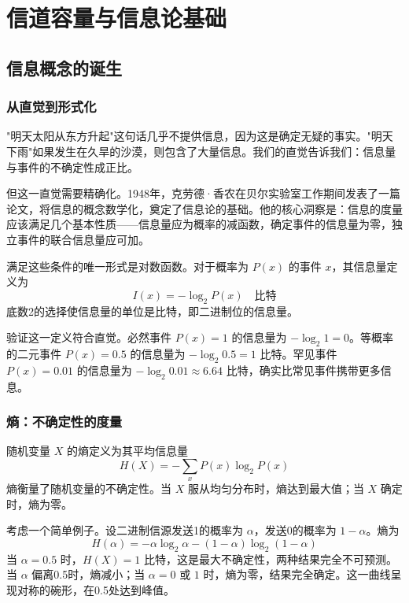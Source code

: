 \section{信道容量与信息论基础}

\subsection{信息概念的诞生}

\subsubsection{从直觉到形式化}

"明天太阳从东方升起"这句话几乎不提供信息，因为这是确定无疑的事实。"明天下雨"如果发生在久旱的沙漠，则包含了大量信息。我们的直觉告诉我们：信息量与事件的不确定性成正比。

但这一直觉需要精确化。1948年，克劳德·香农在贝尔实验室工作期间发表了一篇论文，将信息的概念数学化，奠定了信息论的基础。他的核心洞察是：信息的度量应该满足几个基本性质——信息量应为概率的减函数，确定事件的信息量为零，独立事件的联合信息量应可加。

满足这些条件的唯一形式是对数函数。对于概率为 $P(x)$ 的事件 $x$，其信息量定义为
\begin{equation}
    I(x) = -\log_2 P(x) \quad \text{比特}
\end{equation}
底数2的选择使信息量的单位是比特，即二进制位的信息量。

验证这一定义符合直觉。必然事件 $P(x)=1$ 的信息量为 $-\log_2 1 = 0$。等概率的二元事件 $P(x)=0.5$ 的信息量为 $-\log_2 0.5 = 1$ 比特。罕见事件 $P(x)=0.01$ 的信息量为 $-\log_2 0.01 \approx 6.64$ 比特，确实比常见事件携带更多信息。

\subsubsection{熵：不确定性的度量}

随机变量 $X$ 的熵定义为其平均信息量
\begin{equation}
    H(X) = -\sum_{x} P(x) \log_2 P(x)
\end{equation}
熵衡量了随机变量的不确定性。当 $X$ 服从均匀分布时，熵达到最大值；当 $X$ 确定时，熵为零。

考虑一个简单例子。设二进制信源发送1的概率为 $\alpha$，发送0的概率为 $1-\alpha$。熵为
\begin{equation}
    H(\alpha) = -\alpha \log_2 \alpha - (1-\alpha) \log_2 (1-\alpha)
\end{equation}
当 $\alpha = 0.5$ 时，$H(X) = 1$ 比特，这是最大不确定性，两种结果完全不可预测。当 $\alpha$ 偏离0.5时，熵减小；当 $\alpha = 0$ 或 $1$ 时，熵为零，结果完全确定。这一曲线呈现对称的碗形，在0.5处达到峰值。

